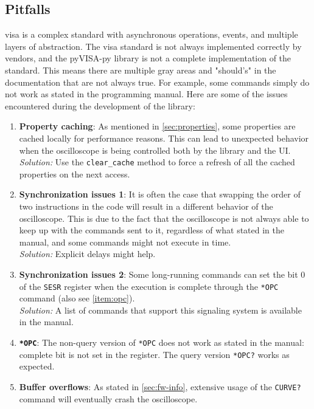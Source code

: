 \documentclass[a4paper,english,twoside,10pt]{article}
\begin{document}
\subsection{Pitfalls}\label{sec:pitfalls}
\gls{visa} is a complex standard with asynchronous operations, events, and multiple layers of abstraction. The \gls{visa} standard is not always implemented correctly by vendors, and the pyVISA-py library is not a complete implementation of the standard. This means there are multiple gray areas and "should's" in the documentation that are not always true. For example, some commands simply do not work as stated in the programming manual\cite{tektronix:mso-progman}. Here are some of the issues encountered during the development of the library:
\begin{enumerate}[label=\textbf{P.\arabic*},ref=P.\arabic*]
	\item \textbf{Property caching}: As mentioned in \ref{sec:properties}, some properties are cached locally for performance reasons. This can lead to unexpected behavior when the oscilloscope is being controlled both by the library and the UI.\\
	\textit{Solution:} Use the \texttt{clear\_cache} method to force a refresh of all the cached properties on the next access.
	\item \textbf{Synchronization issues 1}: It is often the case that swapping the order of two instructions in the code will result in a different behavior of the oscilloscope. This is due to the fact that the oscilloscope is not always able to keep up with the commands sent to it, regardless of what stated in the manual\cite[p.~1915]{tektronix:mso-progman}, and some commands might not execute in time.\\
	\textit{Solution:} Explicit delays might help.
	\item \textbf{Synchronization issues 2}: Some long-running commands can set the bit 0 of the \texttt{SESR} register when the execution is complete through the \texttt{*OPC} command (also see \autoref{item:opc}).\\
	\textit{Solution:} A list of commands that support this signaling system is available in the manual\cite[t.~3-3]{tektronix:mso-progman}.
	\item \textbf{\texttt{*OPC}}\label{item:opc}: The non-query version of \texttt{*OPC} does not work as stated in the manual\cite[p.~1001]{tektronix:mso-progman}: complete bit is not set in the register. The query version \texttt{*OPC?} works as expected.
	\item \textbf{Buffer overflows}\label{item:curvestream}: As stated in \ref{sec:fw-info}, extensive usage of the \texttt{CURVE?} command will eventually crash the oscilloscope.\\

\end{enumerate}
\end{document}
